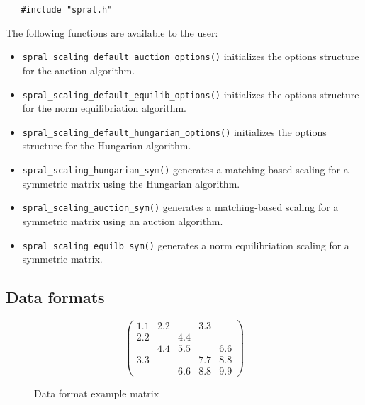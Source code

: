 \begin{verbatim}
   #include "spral.h"
\end{verbatim}

\noindent
The following functions are available to the user:
\begin{itemize}
\item {\tt spral\_scaling\_default\_auction\_options()} initializes the options structure for the auction algorithm.
\item {\tt spral\_scaling\_default\_equilib\_options()} initializes the options structure for the norm equilibriation algorithm.
\item {\tt spral\_scaling\_default\_hungarian\_options()} initializes the options structure for the Hungarian algorithm.
\item {\tt spral\_scaling\_hungarian\_sym()} generates a matching-based scaling for a symmetric matrix using the Hungarian algorithm.
\item {\tt spral\_scaling\_auction\_sym()} generates a matching-based scaling for a symmetric matrix using an auction algorithm.
\item {\tt spral\_scaling\_equilb\_sym()} generates a norm equilibriation scaling for a symmetric matrix.
\end{itemize}

\subsection{Data formats} \label{dataformats}

\begin{figure}
   \caption{ \label{format eg}
      Data format example matrix
   }
   $$
      \left( \begin{array}{ccccc}
         1.1 & 2.2 &     & 3.3 &     \\
         2.2 &     & 4.4 &     &     \\
             & 4.4 & 5.5 &     & 6.6 \\
         3.3 &     &     & 7.7 & 8.8 \\
             &     & 6.6 & 8.8 & 9.9
      \end{array} \right)
   $$
\end{figure}

